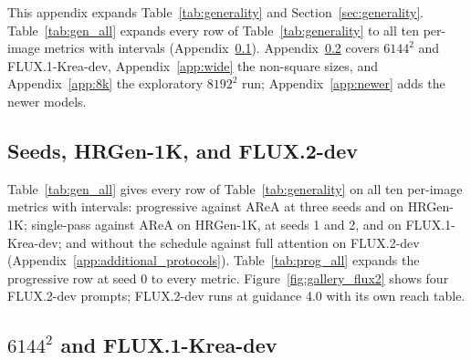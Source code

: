 This appendix expands Table~\ref{tab:generality} and Section~\ref{sec:generality}. Table~\ref{tab:gen_all} expands every row of Table~\ref{tab:generality} to all ten per-image metrics with intervals (Appendix~\ref{app:gen_seeds}). Appendix~\ref{app:gen_krea} covers $6144^2$ and FLUX.1-Krea-dev, Appendix~\ref{app:wide} the non-square sizes, and Appendix~\ref{app:8k} the exploratory $8192^2$ run\ifanynewmodel; Appendix~\ref{app:newer} adds the newer models\fi.

\subsection{Seeds, HRGen-1K, and FLUX.2-dev}
\label{app:gen_seeds}

Table~\ref{tab:gen_all} gives every row of Table~\ref{tab:generality} on all ten per-image metrics with intervals: progressive \sca{} against AReA at three seeds and on HRGen-1K; single-pass \sca{} against AReA on HRGen-1K, at seeds 1 and 2, and on FLUX.1-Krea-dev; and \sca{} without the schedule against full attention on FLUX.2-dev (Appendix~\ref{app:additional_protocols}). Table~\ref{tab:prog_all} expands the progressive row at seed 0 to every metric. Figure~\ref{fig:gallery_flux2} shows four FLUX.2-dev prompts; FLUX.2-dev runs at guidance 4.0 with its own reach table.


\apxseedspage
\apxhrgenpage
{}

\subsection{\texorpdfstring{$6144^2$}{6144x6144} and FLUX.1-Krea-dev}
\label{app:gen_krea}

